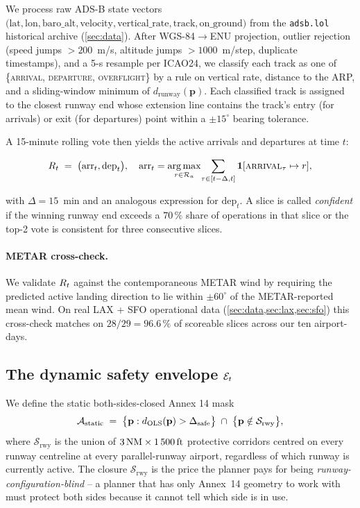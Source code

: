 We process raw ADS-B state vectors $\bigl(\text{lat}, \text{lon},
\text{baro\_alt}, \text{velocity}, \text{vertical\_rate}, \text{track},
\text{on\_ground}\bigr)$ from the \texttt{adsb.lol} historical archive
(\cref{sec:data}). After WGS-84$\rightarrow$ENU projection, outlier rejection
(speed jumps $>200$~m/s, altitude jumps $>1000$~m/step, duplicate timestamps),
and a 5-s resample per ICAO24, we classify each track as one of
\{\textsc{arrival}, \textsc{departure}, \textsc{overflight}\} by a rule on
vertical rate, distance to the ARP, and a sliding-window minimum of
$d_{\mathrm{runway}}(\mathbf{p})$. Each classified track is assigned to the
closest runway end whose extension line contains the track's entry (for
arrivals) or exit (for departures) point within a $\pm15^\circ$ bearing
tolerance.

A 15-minute rolling vote then yields the active arrivals and departures at
time $t$:

\begin{equation}
R_t \;=\; \bigl( \text{arr}_t, \text{dep}_t \bigr),
\quad
\text{arr}_t = \operatorname*{arg\,max}_{r \in \mathcal{R}_a}\!\sum_{\tau \in [t-\Delta, t]} \mathbf{1}[\textsc{arrival}_\tau \mapsto r],
\label{eq:Rt}
\end{equation}

with $\Delta = 15$~min and an analogous expression for $\text{dep}_t$. A
slice is called \emph{confident} if the winning runway end exceeds a
$70\,\%$ share of operations in that slice or the top-2 vote is consistent
for three consecutive slices.

\paragraph{METAR cross-check.}
We validate $R_t$ against the contemporaneous METAR wind by requiring the
predicted active landing direction to lie within $\pm 60^\circ$ of the
METAR-reported mean wind. On real LAX + SFO operational data
(\cref{sec:data,sec:lax,sec:sfo}) this cross-check matches on
$28/29 = 96.6\,\%$ of scoreable slices across our ten airport-days.

\subsection{The dynamic safety envelope $\mathcal{E}_t$}
\label{sec:method-envelope}

We define the static both-sides-closed Annex 14 mask
\begin{equation}
\mathcal{A}_{\mathrm{static}}
\;=\;
\bigl\{
\mathbf{p} : d_{\mathrm{OLS}}(\mathbf{p}) > \Delta_{\mathrm{safe}}
\bigr\}
\;\cap\;
\bigl\{
\mathbf{p} \notin \mathcal{S}_{\mathrm{rwy}}
\bigr\},
\label{eq:Astatic}
\end{equation}
where $\mathcal{S}_{\mathrm{rwy}}$ is the union of $3\,\mathrm{NM} \times 1\,500\,\mathrm{ft}$
protective corridors centred on every runway centreline at every parallel-runway
airport, regardless of which runway is currently active. The closure
$\mathcal{S}_{\mathrm{rwy}}$ is the price the planner pays for being
\emph{runway-configuration-blind} -- a planner that has only Annex~14
geometry to work with must protect both sides because it cannot tell which
side is in use.

